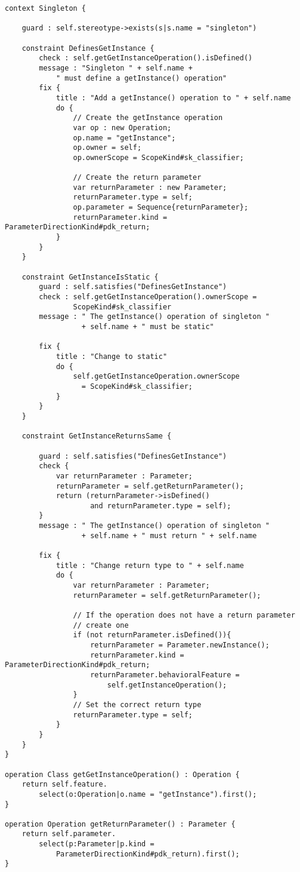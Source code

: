 \begin{lstlisting}[basicstyle=\small,caption=EVL Module for Validating Singletons, label=lst:CaseStudy, language=EVL]
context Singleton {
	
	guard : self.stereotype->exists(s|s.name = "singleton")
	
	constraint DefinesGetInstance {
		check : self.getGetInstanceOperation().isDefined()
		message : "Singleton " + self.name + 
			" must define a getInstance() operation"
		fix {
			title : "Add a getInstance() operation to " + self.name
			do {
				// Create the getInstance operation
				var op : new Operation;
				op.name = "getInstance";
				op.owner = self;
				op.ownerScope = ScopeKind#sk_classifier;
				
				// Create the return parameter
				var returnParameter : new Parameter;
				returnParameter.type = self;
				op.parameter = Sequence{returnParameter};
				returnParameter.kind = ParameterDirectionKind#pdk_return;
			}
		}
	}
	
	constraint GetInstanceIsStatic {
		guard : self.satisfies("DefinesGetInstance")
		check : self.getGetInstanceOperation().ownerScope = 
		        ScopeKind#sk_classifier
		message : " The getInstance() operation of singleton " 
		          + self.name + " must be static"
	
		fix {
			title : "Change to static"
			do {
				self.getGetInstanceOperation.ownerScope 
				  = ScopeKind#sk_classifier;
			}
		}
	}
	
	constraint GetInstanceReturnsSame {
	
		guard : self.satisfies("DefinesGetInstance")
		check {
			var returnParameter : Parameter;
			returnParameter = self.getReturnParameter();
			return (returnParameter->isDefined() 
			        and returnParameter.type = self);
		}
		message : " The getInstance() operation of singleton " 
		          + self.name + " must return " + self.name
			
		fix {
			title : "Change return type to " + self.name
			do {
				var returnParameter : Parameter;
				returnParameter = self.getReturnParameter();
				
				// If the operation does not have a return parameter
				// create one
				if (not returnParameter.isDefined()){
					returnParameter = Parameter.newInstance();
					returnParameter.kind = ParameterDirectionKind#pdk_return;
					returnParameter.behavioralFeature = 
						self.getInstanceOperation();
				}
				// Set the correct return type
				returnParameter.type = self;
			}
		}
	}
}

operation Class getGetInstanceOperation() : Operation {
	return self.feature.
		select(o:Operation|o.name = "getInstance").first();
}

operation Operation getReturnParameter() : Parameter {
	return self.parameter.
		select(p:Parameter|p.kind = 
			ParameterDirectionKind#pdk_return).first();
}
\end{lstlisting}